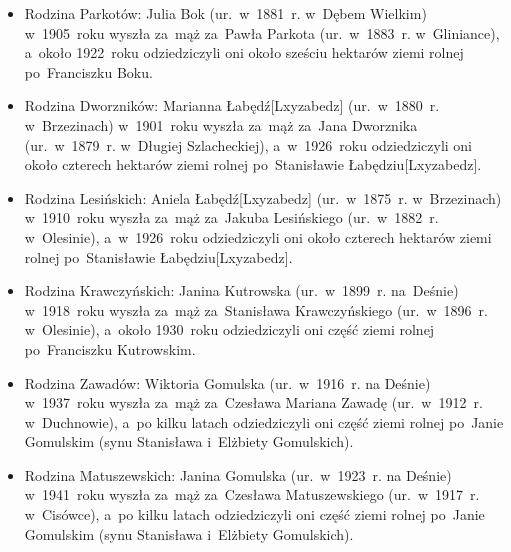 \begin{itemize}
    \item Rodzina Parkotów: Julia Bok (ur.~w~1881~r. w~Dębem Wielkim) w~1905~roku wyszła za~mąż
    za~Pawła Parkota (ur.~w~1883~r.
    w~Gliniance), a~około 1922~roku odziedziczyli oni około sześciu hektarów
    ziemi rolnej po~Franciszku Boku.
    \item Rodzina Dworzników: Marianna
    Łabędź[Lxyzabedz]
    (ur.~w~1880~r. w~Brzezinach) w~1901~roku wyszła za~mąż za~Jana
    Dworznika
    (ur.~w~1879~r. w~Długiej Szlacheckiej), a~w~1926~roku odziedziczyli oni
    około czterech hektarów ziemi rolnej po~Stanisławie
    Łabędziu[Lxyzabedz].
    \item Rodzina Lesińskich: Aniela
    Łabędź[Lxyzabedz]
    (ur.~w~1875~r. w~Brzezinach) w~1910~roku wyszła za~mąż za~Jakuba
    Lesińskiego (ur.~w~1882~r.
    w~Olesinie), a~w~1926~roku odziedziczyli oni około czterech hektarów ziemi
    rolnej po~Stanisławie Łabędziu[Lxyzabedz].
    \item Rodzina Krawczyńskich: Janina
    Kutrowska
    (ur.~w~1899~r. na~Deśnie) w~1918~roku wyszła za~mąż za~Stanisława
    Krawczyńskiego
    (ur.~w~1896~r. w~Olesinie), a~około 1930~roku odziedziczyli oni część
    ziemi rolnej po~Franciszku
    Kutrowskim.
    \item Rodzina Zawadów: Wiktoria
    Gomulska
    (ur.~w~1916~r. na Deśnie) w~1937~roku wyszła za~mąż za~Czesława Mariana
    Zawadę (ur.~w~1912~r.
    w~Duchnowie), a~po kilku latach odziedziczyli oni część ziemi rolnej
    po~Janie Gomulskim (synu
    Stanisława i~Elżbiety Gomulskich).
    \item Rodzina Matuszewskich: Janina
    Gomulska
    (ur.~w~1923~r. na Deśnie) w~1941~roku wyszła za~mąż
    za~Czesława Matuszewskiego
    (ur.~w~1917~r. w~Cisówce), a~po kilku latach odziedziczyli oni część ziemi
    rolnej po~Janie Gomulskim (synu Stanisława i~Elżbiety Gomulskich).
\end{itemize}

